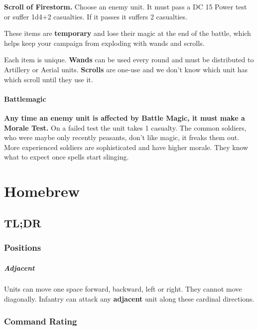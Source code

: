 \documentclass[letterpaper,twocolumn,openany,nodeprecatedcode]{dndbook}
\begin{document}
\textbf{Scroll of Firestorm.} Choose an enemy unit. It must pass a DC 15 Power test or suffer 1d4+2 casualties. If it passes it suffers 2 casualties.

These items are \textbf{temporary} and lose their magic at the end of the battle, which helps keep your campaign from exploding with wands and scrolls.

Each item is unique. \textbf{Wands} can be used every round and must be distributed to Artillery or Aerial units. \textbf{Scrolls} are one-use and we don’t know which unit has which scroll until they use it.

\subsubsection{Battlemagic}

\textbf{Any time an enemy unit is affected by Battle Magic, it must make a Morale Test.} On a failed test the unit takes 1 casualty. The common soldiers, who were maybe only recently peasants, don’t like magic, it freaks them out. More experienced soldiers are sophisticated and have higher morale. They know what to expect once spells start slinging.

\chapter{Homebrew}

\section{TL;DR}

\subsection{Positions}

\paragraph{Adjacent}

Units can move one space forward, backward, left or right.
They cannot move diagonally.
Infantry can attack any \textbf{adjacent} unit along these cardinal directions.

\subsection{Command Rating}
\end{document}
